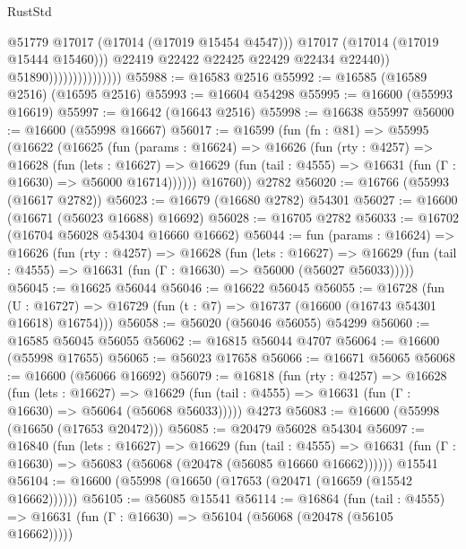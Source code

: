 \begin{lexlean}{RustStd}
\begin{coremodule}
                                          @51779
                                          @17017
                                          (@17014 (@17019 @15454 @4547)))
                                        @17017
                                        (@17014 (@17019 @15444 @15460)))
                                      @22419
                                      @22422
                                      @22425
                                      @22429
                                      @22434
                                      @22440))
                                  @51890)))))))))))))))
@55988 := @16583 @2516
@55992 := @16585 (@16589 @2516) (@16595 @2516)
@55993 := @16604 @54298
@55995 := @16600 (@55993 @16619)
@55997 := @16642 (@16643 @2516)
@55998 := @16638 @55997
@56000 := @16600 (@55998 @16667)
@56017 := @16599
    (fun (fn : @81) =>
    @55995
      (@16622
        (@16625
          (fun (params : @16624) =>
          @16626
            (fun (rty : @4257) =>
            @16628
              (fun (lets : @16627) =>
              @16629 (fun (tail : @4555) => @16631 (fun (Γ : @16630) => @56000 @16714))))))
        @16760))
    @2782
@56020 := @16766 (@55993 (@16617 @2782))
@56023 := @16679 (@16680 @2782) @54301
@56027 := @16600 (@16671 (@56023 @16688) @16692)
@56028 := @16705 @2782
@56033 := @16702 (@16704 @56028 @54304 @16660 @16662)
@56044 := fun (params : @16624) =>
  @16626
    (fun (rty : @4257) =>
    @16628
      (fun (lets : @16627) =>
      @16629 (fun (tail : @4555) => @16631 (fun (Γ : @16630) => @56000 (@56027 @56033)))))
@56045 := @16625 @56044
@56046 := @16622 @56045
@56055 := @16728
    (fun (U : @16727) => @16729 (fun (t : @7) => @16737 (@16600 (@16743 @54301 @16618) @16754)))
@56058 := @56020 (@56046 @56055) @54299
@56060 := @16585 @56045 @56055
@56062 := @16815 @56044 @4707
@56064 := @16600 (@55998 @17655)
@56065 := @56023 @17658
@56066 := @16671 @56065
@56068 := @16600 (@56066 @16692)
@56079 := @16818
    (fun (rty : @4257) =>
    @16628
      (fun (lets : @16627) =>
      @16629 (fun (tail : @4555) => @16631 (fun (Γ : @16630) => @56064 (@56068 @56033)))))
    @4273
@56083 := @16600 (@55998 (@16650 (@17653 @20472)))
@56085 := @20479 @56028 @54304
@56097 := @16840
    (fun (lets : @16627) =>
    @16629
      (fun (tail : @4555) =>
      @16631 (fun (Γ : @16630) => @56083 (@56068 (@20478 (@56085 @16660 @16662))))))
    @15541
@56104 := @16600 (@55998 (@16650 (@17653 (@20471 (@16659 (@15542 @16662))))))
@56105 := @56085 @15541
@56114 := @16864
    (fun (tail : @4555) => @16631 (fun (Γ : @16630) => @56104 (@56068 (@20478 (@56105 @16662)))))

\end{coremodule}
\end{lexlean}
